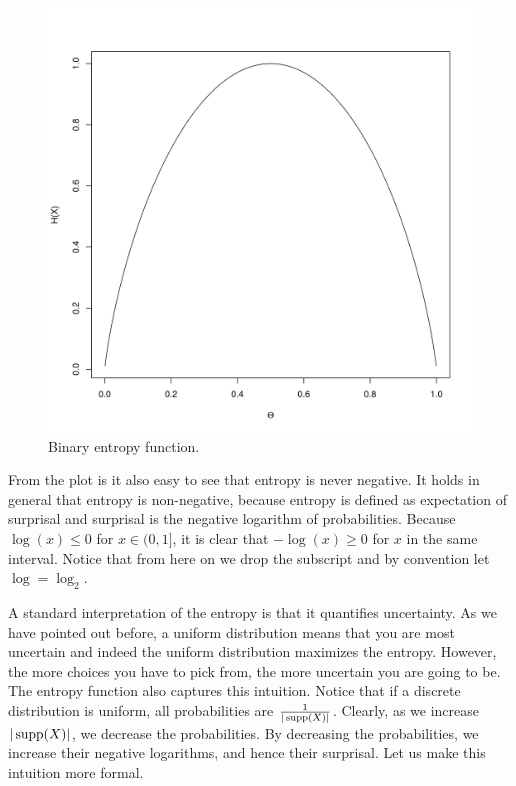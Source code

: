 \begin{figure}
\center
\includegraphics[scale=0.4]{binaryEntropy.png}
\caption{Binary entropy function.}
\label{fig:binaryEntropy}
\end{figure}

From the plot is it also easy to see that entropy is never negative. It holds in general that entropy is non-negative,
because entropy is defined as expectation of surprisal and surprisal is the negative logarithm of probabilities. 
Because $ \log(x) \leq 0 $ for $ x \in (0,1] $, it is clear that $ -\log(x) \geq 0 $ for $ x $ in the same
interval. Notice that from here on we drop the subscript and by convention let $ \log = \log_{2} $.

A standard interpretation of the entropy is that it quantifies uncertainty. As we have pointed out
before, a uniform distribution means that you are most uncertain and
indeed the uniform distribution maximizes the entropy. However, the more choices you have to pick from, the more uncertain you are going to be. 
The entropy function also captures this intuition. Notice that if a discrete distribution is uniform,
all probabilities are $ \frac{1}{|\operatorname{supp}(X)|} $. Clearly, as we increase $ |\operatorname{supp}(X)| $, we decrease the
probabilities. By decreasing the probabilities, we increase their negative logarithms, and hence their
surprisal. Let us make this intuition more formal.

